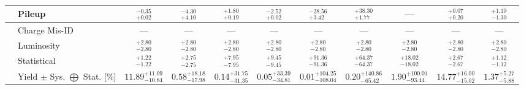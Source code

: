 \begin{tabular}{|cl||ccccccc|c||c|}
&Pileup &  $^{-0.35}_{+0.02}$  &  $^{-4.30}_{+4.10}$  &  $^{+1.80}_{+0.19}$  &  $^{-2.52}_{+0.02}$  &  $^{-28.56}_{+3.42}$  &  $^{+38.30}_{+1.77}$  & --- &  $^{+0.07}_{+0.20}$  &  $^{+1.10}_{-1.30}$ \\ 
\hline
&Charge Mis-ID & --- & --- & --- & --- & --- & --- & --- & --- & ---\\ 
\hline
&Luminosity &  $^{+2.80}_{-2.80}$  &  $^{+2.80}_{-2.80}$  &  $^{+2.80}_{-2.80}$  &  $^{+2.80}_{-2.80}$  &  $^{+2.80}_{-2.80}$  &  $^{+2.80}_{-2.80}$  &  $^{+2.80}_{-2.80}$  &  $^{+2.80}_{-2.80}$  &  $^{+2.80}_{-2.80}$ \\ 
\hline
&Statistical &  $^{+1.22}_{-1.22}$  &  $^{+2.75}_{-2.75}$  &  $^{+7.95}_{-7.95}$  &  $^{+9.45}_{-9.45}$  &  $^{+91.36}_{-91.36}$  &  $^{+64.37}_{-64.37}$  &  $^{+18.02}_{-18.02}$  &  $^{+2.67}_{-2.67}$  &  $^{+1.12}_{-1.12}$ \\ 
\hline
\hline
&Yield $\pm$ Sys. $\bigoplus$ Stat. [\%] &  $11.89^{+11.09}_{-10.84}$  &  $0.58^{+18.18}_{-17.98}$  &  $0.14^{+31.75}_{-31.35}$  &  $0.05^{+33.39}_{-34.81}$  &  $0.01^{+104.25}_{-108.04}$  &  $0.20^{+140.86}_{-65.42}$  &  $1.90^{+100.01}_{-93.44}$  &  $14.77^{+16.00}_{-15.02}$  &  $1.37^{+5.27}_{-5.88}$ \\ 
\hline
\end{tabular}
